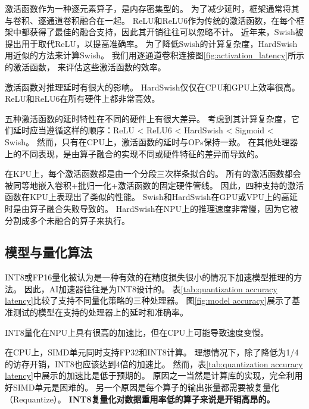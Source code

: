 
激活函数作为一种逐元素算子，是内存密集型的。
为了减少延时，框架通常将其与卷积、逐通道卷积融合在一起。
ReLU和ReLU6作为传统的激活函数，在每个框架中都获得了最佳的融合支持，因此其开销往往可以忽略不计。
近年来，Swish被提出用于取代ReLU，以提高准确率。
为了降低Swish的计算复杂度，HardSwish用近似的方法来计算Swish。
我们用逐通道卷积连接图\ref{fig:activation_latency}所示的激活函数，
来评估这些激活函数的效率。

\begin{finding}
    激活函数对推理延时有很大的影响。
    HardSwish仅仅在CPU和GPU上效率很高。
    ReLU和ReLU6在所有硬件上都非常高效。
\end{finding}

五种激活函数的延时特性在不同的硬件上有很大差异。
考虑到其计算复杂度，它们延时应当遵循这样的顺序：ReLU < ReLU6 < HardSwish < Sigmoid < Swish。
然而，只有在CPU上，激活函数的延时与OPs保持一致。
在其他处理器上的不同表现，是由算子融合的实现不同或硬件特征的差异而导致的。

在KPU上，每个激活函数都是由一个分段三次样条拟合的。
所有的激活函数都会被同等地嵌入卷积+批归一化+激活函数的固定硬件管线。
因此，四种支持的激活函数在KPU上表现出了类似的性能。
Swish和HardSwish在GPU或VPU上的高延时是由算子融合失败导致的。
HardSwish在NPU上的推理速度非常慢，因为它被分割成多个未融合的算子来执行。

\subsection{模型与量化算法}
\label{analysis:model quantization}


INT8或FP16量化被认为是一种有效的在精度损失很小的情况下加速模型推理的方法。
因此，AI加速器往往是为INT8设计的。
表\ref{tab:quantization accuracy latency}比较了支持不同量化策略的三种处理器。
图\ref{fig:model accuracy}展示了基准测试的模型在支持的处理器上的延时和准确率。

\begin{finding}
    INT8量化在NPU上具有很高的加速比，但在CPU上可能导致速度变慢。
\end{finding}

在CPU上，SIMD单元同时支持FP32和INT8计算。
理想情况下，除了降低为1/4的访存开销，INT8也应该达到4倍的加速比。
然而，表\ref{tab:quantization accuracy latency}中展示的加速比是低于预期的。
原因之一当然是计算库的实现，完全利用好SIMD单元是困难的。
另一个原因是每个算子的输出张量都需要被复量化（Requantize）。
\textbf{INT8复量化对数据重用率低的算子来说是开销高昂的。}

